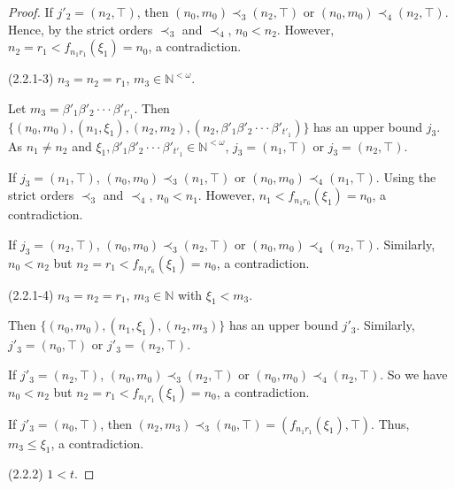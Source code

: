 \documentclass[10pt,a4paper]{amsart}
\begin{document}
\begin{proof}
If $j'_{2}=(n_{2},\top)$, then $(n_{0},m_{0})\prec_{3}(n_{2},\top)$ or $(n_{0},m_{0})\prec_{4}(n_{2},\top)$. Hence, by the strict orders $\prec_{3}$ and $\prec_{4}$, $n_{0}<n_{2}$. However, $n_{2}=r_{1}<f_{n_{1}r_{1}}(\xi_{1})=n_{0}$, a contradiction.

(2.2.1-3) $n_{3}=n_{2}=r_{1}$, $m_{3}\in\mathbb{N}^{<\omega}$.

Let $m_{3}=\beta'_{1}\beta'_{2}\cdot\cdot\cdot\beta'_{t'_{1}}$. Then $\{(n_{0},m_{0}),(n_{1},\xi_{1}),(n_{2},m_{2}),(n_{2},\beta'_{1}\beta'_{2}\cdot\cdot\cdot\beta'_{t'_{1}})\}$ has an upper bound $j_{3}$. As $n_{1}\neq n_{2}$ and $\xi_{1},\beta'_{1}\beta'_{2}\cdot\cdot\cdot\beta'_{t'_{1}}\in\mathbb{N}^{<\omega}$, $j_{3}=(n_{1},\top)$ or $j_{3}=(n_{2},\top)$.

If $j_{3}=(n_{1},\top)$, $(n_{0},m_{0})\prec_{3}(n_{1},\top)$ or $(n_{0},m_{0})\prec_{4}(n_{1},\top)$. Using the strict orders $\prec_{3}$ and $\prec_{4}$, $n_{0}<n_{1}$. However, $n_{1}<f_{n_{1}r_{6}}(\xi_{1})=n_{0}$, a contradiction.

If $j_{3}=(n_{2},\top)$, $(n_{0},m_{0})\prec_{3}(n_{2},\top)$ or $(n_{0},m_{0})\prec_{4}(n_{2},\top)$. Similarly, $n_{0}<n_{2}$ but $n_{2}=r_{1}<f_{n_{1}r_{6}}(\xi_{1})=n_{0}$, a contradiction.

(2.2.1-4) $n_{3}=n_{2}=r_{1}$, $m_{3}\in\mathbb{N}$ with $\xi_{1}<m_{3}$.

Then $\{(n_{0},m_{0}),(n_{1},\xi_{1}),(n_{2},m_{3})\}$ has an upper bound $j'_{3}$. Similarly, $j'_{3}=(n_{0},\top)$ or $j'_{3}=(n_{2},\top)$.

If $j'_{3}=(n_{2},\top)$, $(n_{0},m_{0})\prec_{3}(n_{2},\top)$ or $(n_{0},m_{0})\prec_{4}(n_{2},\top)$. So we have $n_{0}<n_{2}$ but $n_{2}=r_{1}<f_{n_{1}r_{1}}(\xi_{1})=n_{0}$, a contradiction.

If $j'_{3}=(n_{0},\top)$, then  $(n_{2},m_{3})\prec_{3}(n_{0},\top)=(f_{n_{1}r_{1}}(\xi_{1}),\top)$. Thus, $m_{3}\leq\xi_{1}$, a contradiction.


(2.2.2) $1<t$.


\end{proof}
\end{document}
